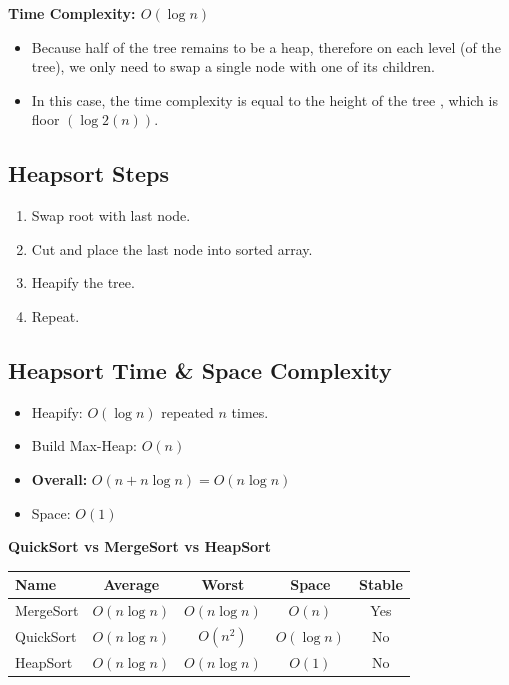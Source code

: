 \textbf{Time Complexity: $O(\log n)$}
\begin{itemize}
    \item Because half of the tree remains to be a heap, therefore on each level (of the tree), we only need to
swap a single node with one of its children.
    \item In this case, the time complexity is equal to the height of the tree , which is floor $(\log 2(n))$.
\end{itemize}

\subsection{Heapsort Steps}

\begin{enumerate}
  \item Swap root with last node.
  \item Cut and place the last node into sorted array.
  \item Heapify the tree.
  \item Repeat.
\end{enumerate}

\subsection*{Heapsort Time \& Space Complexity}

\begin{itemize}
  \item Heapify: $O(\log n)$ repeated $n$ times.
  \item Build Max-Heap: $O(n)$
  \item \textbf{Overall:} $O(n + n\log n) = O(n\log n)$
  \item Space: $O(1)$
\end{itemize}

\textbf{QuickSort vs MergeSort vs HeapSort}

\begin{center}
\begin{tabular}{|l|c|c|c|c|}
\hline
Name & Average & Worst & Space & Stable \\
\hline
MergeSort & $O(n\log n)$ & $O(n\log n)$ & $O(n)$ & Yes \\
QuickSort & $O(n\log n)$ & $O(n^2)$ & $O(\log n)$ & No \\
HeapSort & $O(n\log n)$ & $O(n\log n)$ & $O(1)$ & No \\
\hline
\end{tabular}
\end{center}


